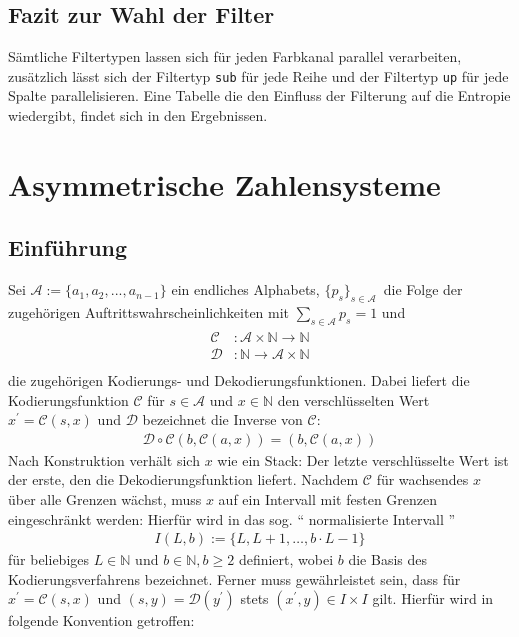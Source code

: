 \documentclass[a4paper,12pt]{article}
\newcommand{\N}{\mathbb N}
\newcommand{\A}{\mathcal A}
\newcommand{\C}{\mathcal C}
\newcommand{\D}{\mathcal D}
\begin{document}
\subsection{Fazit zur Wahl der Filter}
Sämtliche Filtertypen lassen sich für jeden Farbkanal parallel verarbeiten, zusätzlich lässt sich der Filtertyp {\tt{sub}} für jede Reihe und der Filtertyp {\tt{up}} für jede Spalte parallelisieren. Eine Tabelle die den Einfluss der Filterung auf die Entropie wiedergibt, findet sich in den Ergebnissen.
\newpage
\section{Asymmetrische Zahlensysteme}\label{ANS}
\subsection{Einführung}
Sei $\A:=\{a_{1},a_{2},...,a_{n-1}\}$  ein endliches Alphabets, $\{p_{s}\}_{s\in \A}\, $ die Folge der zugehörigen Auftrittswahrscheinlichkeiten mit
$\sum_{s\in \A} p_{s} =1$ und
\begin{align*}
             \begin{array} {ccc}
              \C &:\A \times \N  \rightarrow  \N \\
             \D &: \N\rightarrow\A \times \N\\
              \end{array}
\end{align*}
die zugehörigen Kodierungs- und Dekodierungsfunktionen. Dabei liefert die Kodierungsfunktion $ \C$ für $s\in\A$ und $x\in \N$  den verschlüsselten Wert $x^{'} = \mathcal C(s,x)$ und $\D$ bezeichnet die Inverse von $\C$:
\begin{align*}
\D \circ \C  \left( b, \C(a,x)\right)  = (b, \C(a,x))
\end{align*}
Nach Konstruktion verhält sich $x$ wie ein Stack: Der letzte verschlüsselte Wert ist der erste, den die Dekodierungsfunktion liefert. Nachdem $\C$ für wachsendes $x$ über alle Grenzen wächst, muss $x$ auf ein Intervall mit festen Grenzen eingeschränkt werden: Hierfür wird in \cite{Duda} das sog. "` normalisierte Intervall "' 
\begin{align*}
I(L,b):=\{L,L+1,\ldots,b\cdot L-1\}
\end{align*}
für beliebiges $L \in \N$ und $b\in \N, b\geq 2$ definiert, wobei $b$ die Basis des Kodierungsverfahrens bezeichnet. Ferner muss gewährleistet sein, dass für $x^{'} = \C(s,x)$  und $(s,y) = \D(y^{'})$ stets $(x^{'}, y) \in I\times I$ gilt. Hierfür wird in \cite{Krajcevski} folgende Konvention getroffen:
\end{document}
